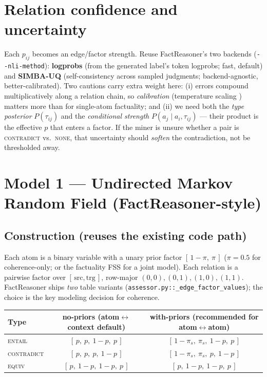 \documentclass[11pt]{article}
\begin{document}
\section{Relation confidence and uncertainty}
\label{sec:conf}

Each $p_{ij}$ becomes an edge/factor strength. Reuse FactReasoner's two backends
(\texttt{-{}-nli-method}): \textbf{logprobs} (from the generated label's token logprobs;
fast, default) and \textbf{SIMBA-UQ} \citep{simbauq} (self-consistency across sampled
judgments; backend-agnostic, better-calibrated). Two cautions carry extra weight here:
(i) errors compound multiplicatively along a relation chain, so \emph{calibration}
(temperature scaling \citep{calib}) matters more than for single-atom factuality; and
(ii) we need both the \emph{type posterior} $P(\tau_{ij})$ and the \emph{conditional
strength} $P(a_j\mid a_i,\tau_{ij})$ --- their product is the effective $p$ that enters a
factor. If the miner is unsure whether a pair is \textsc{contradict} vs.\ \textsc{none},
that uncertainty should \emph{soften} the contradiction, not be thresholded away.

\section{Model 1 --- Undirected Markov Random Field (FactReasoner-style)}
\label{sec:mrf}

\subsection{Construction (reuses the existing code path)}
Each atom is a binary variable with a unary prior factor $[\,1-\pi,\ \pi\,]$
($\pi=0.5$ for coherence-only; or the factuality FSS for a joint model). Each relation is a
pairwise factor over $[\,\text{src},\text{trg}\,]$, row-major
$(0,0),(0,1),(1,0),(1,1)$. FactReasoner ships \emph{two} table variants
(\texttt{assessor.py::\_edge\_factor\_values}); the choice is the key modeling decision for
coherence.

\begin{center}\small
\renewcommand{\arraystretch}{1.2}
\begin{tabular}{@{}lcc@{}}
\toprule
\textbf{Type} & \textbf{no-priors} (atom$\leftrightarrow$context default)
              & \textbf{with-priors} (recommended for atom$\leftrightarrow$atom)\\
\midrule
\textsc{entail}     & $[\,p,\ p,\ 1{-}p,\ p\,]$ & $[\,1{-}\pi_s,\ \pi_s,\ 1{-}p,\ p\,]$\\
\textsc{contradict} & $[\,p,\ p,\ p,\ 1{-}p\,]$ & $[\,1{-}\pi_s,\ \pi_s,\ p,\ 1{-}p\,]$\\
\textsc{equiv}      & $[\,p,\ 1{-}p,\ 1{-}p,\ p\,]$ & $[\,p,\ 1{-}p,\ 1{-}p,\ p\,]$\\
\bottomrule
\end{tabular}
\end{center}
\end{document}
